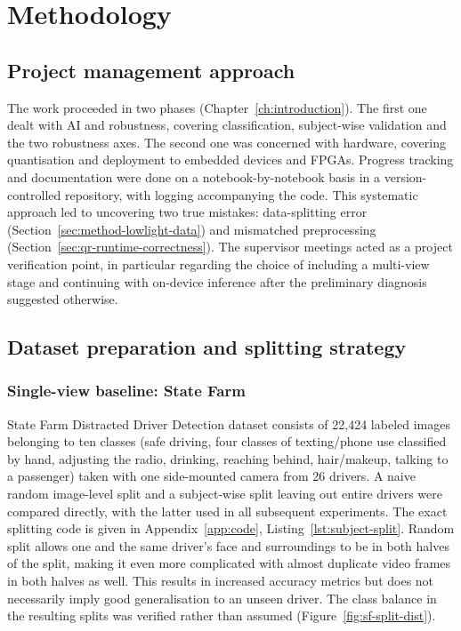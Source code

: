 
\chapter{Methodology}
\label{ch:methodology}

\section{Project management approach}

The work proceeded in two phases (Chapter~\ref{ch:introduction}). The first one dealt with AI and robustness, covering classification, subject-wise validation and the two robustness axes. The second one was concerned with hardware, covering quantisation and deployment to embedded devices and FPGAs. Progress tracking and documentation were done on a notebook-by-notebook basis in a version-controlled repository, with logging accompanying the code. This systematic approach led to uncovering two true mistakes: data-splitting error (Section~\ref{sec:method-lowlight-data}) and mismatched preprocessing (Section~\ref{sec:qr-runtime-correctness}). The supervisor meetings acted as a project verification point, in particular regarding the choice of including a multi-view stage and continuing with on-device inference after the preliminary diagnosis suggested otherwise.

\section{Dataset preparation and splitting strategy}
\label{sec:method-splits}

\subsection{Single-view baseline: State Farm}

State Farm Distracted Driver Detection dataset \citep{statefarm2016dataset} consists of 22,424 labeled images belonging to ten classes (safe driving, four classes of texting/phone use classified by hand, adjusting the radio, drinking, reaching behind, hair/makeup, talking to a passenger) taken with one side-mounted camera from 26 drivers. A naive random image-level split and a subject-wise split leaving out entire drivers were compared directly, with the latter used in all subsequent experiments. The exact splitting code is given in Appendix~\ref{app:code}, Listing~\ref{lst:subject-split}. Random split allows one and the same driver's face and surroundings to be in both halves of the split, making it even more complicated with almost duplicate video frames in both halves as well. This results in increased accuracy metrics but does not necessarily imply good generalisation to an unseen driver. The class balance in the resulting splits was verified rather than assumed (Figure~\ref{fig:sf-split-dist}).

